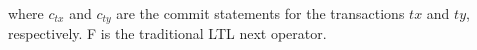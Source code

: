 \documentclass{sig-alternate-05-2015}
\begin{document}
\begin{align}
\begin{split}
\end{split}
  \end{align} where $c_{tx}$ and $c_{ty}$ are the commit statements for the transactions $\mathit{tx}$ and $\mathit{ty}$, respectively. F is the traditional LTL next operator.
\end{document}
